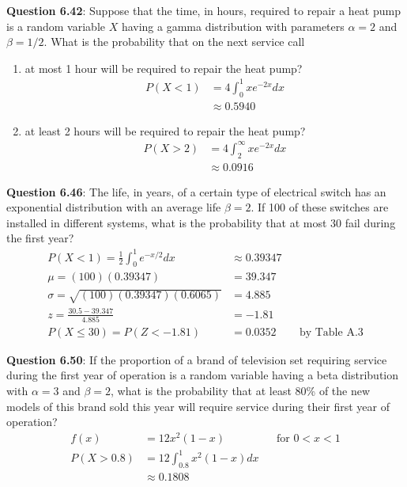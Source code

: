 \documentclass{article}
\begin{document}
    \noindent\textbf{Question 6.42}: Suppose that the time, in hours, required to
    repair a heat pump is a random variable $X$ having a gamma distribution 
    with parameters $\alpha = 2$ and $\beta = 1/2$. What is the probability 
    that on the next service call
        \begin{enumerate}[label = (\alph*) ]
            \item at most 1 hour will be required to repair the heat pump?
                \begin{align*}
                    P(X<1) &= 4\int_0^1 xe^{-2x}dx\\
                    &\approx 0.5940
                \end{align*}
            \item at least 2 hours will be required to repair the heat pump?
                \begin{align*}
                    P(X>2) &= 4\int_2^\infty xe^{-2x}dx\\
                    &\approx 0.0916
                \end{align*}
        \end{enumerate}

    \noindent\textbf{Question 6.46}: The life, in years, of a certain type of electrical
    switch has an exponential distribution with an average life $\beta = 2$. If 100 of 
    these switches are installed in different systems, what is the probability that at 
    most 30 fail during the first year?
        \begin{align*}
            P(X<1) = \frac{1}{2}\int_0^1 e^{-x/2}dx &\approx 0.39347\\
            \mu = (100)(0.39347) &= 39.347\\
            \sigma = \sqrt{(100)(0.39347)(0.6065)} &= 4.885\\
            z = \frac{30.5-39.347}{4.885} &= -1.81\\
            P(X\leq 30) = P(Z < -1.81) &= 0.0352 &&\text{by Table A.3}
        \end{align*}
    
    \noindent\textbf{Question 6.50}: If the proportion of a brand of television set 
    requiring service during the first year of operation is a random variable having 
    a beta distribution with $\alpha = 3$ and $\beta = 2$, what is the probability 
    that at least 80\% of the new models of this brand sold this year will require
    service during their first year of operation?
        \begin{align*}
            f(x) &= 12x^2(1-x) &&\text{for $0 < x < 1$}\\
            P(X > 0.8) &= 12\int_{0.8}^1 x^2(1-x)dx\\
            &\approx 0.1808
        \end{align*}
    
\end{document}
